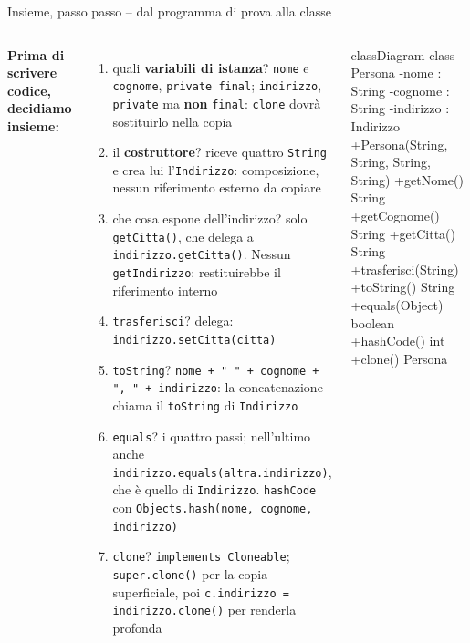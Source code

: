 \documentclass[10pt,aspectratio=169]{beamer}
\begin{document}
\begin{frame}[fragile]{Insieme, passo passo -- dal programma di prova alla classe}
\begin{columns}[T]
\footnotesize
\textbf{Prima di scrivere codice, decidiamo insieme:}
\begin{enumerate}\itemsep=2pt
    \item quali \textbf{variabili di istanza}? \textrightarrow{} \texttt{nome} e \texttt{cognome}, \texttt{private final}; \texttt{indirizzo}, \texttt{private} ma \textbf{non} \texttt{final}: \texttt{clone} dovrà sostituirlo nella copia
    \item il \textbf{costruttore}? \textrightarrow{} riceve quattro \texttt{String} e crea lui l'\texttt{Indirizzo}: composizione, nessun riferimento esterno da copiare
    \item che cosa espone dell'indirizzo? \textrightarrow{} solo \texttt{getCitta()}, che delega a \texttt{indirizzo.getCitta()}. Nessun \texttt{getIndirizzo}: restituirebbe il riferimento interno
    \item \texttt{trasferisci}? \textrightarrow{} delega: \texttt{indirizzo.setCitta(citta)}
    \item \texttt{toString}? \textrightarrow{} \texttt{nome + " " + cognome + ", " + indirizzo}: la concatenazione chiama il \texttt{toString} di \texttt{Indirizzo}
    \item \texttt{equals}? \textrightarrow{} i quattro passi; nell'ultimo anche \texttt{indirizzo.equals(altra.indirizzo)}, che è quello di \texttt{Indirizzo}. \texttt{hashCode} con \texttt{Objects.hash(nome, cognome, indirizzo)}
    \item \texttt{clone}? \textrightarrow{} \texttt{implements Cloneable}; \texttt{super.clone()} per la copia superficiale, poi \texttt{c.indirizzo = indirizzo.clone()} per renderla profonda
\end{enumerate}

\begin{mermaid}
classDiagram
  class Persona {
    -nome : String
    -cognome : String
    -indirizzo : Indirizzo
    +Persona(String, String, String, String)
    +getNome() String
    +getCognome() String
    +getCitta() String
    +trasferisci(String)
    +toString() String
    +equals(Object) boolean
    +hashCode() int
    +clone() Persona
  }
\end{mermaid}
\end{columns}
\end{frame}
\end{document}

